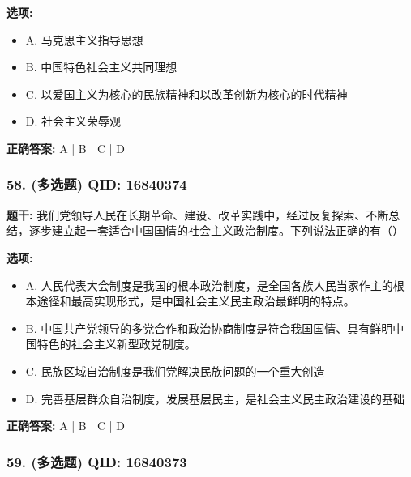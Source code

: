 \documentclass[12pt,UTF8]{ctexart}
\begin{document}
\textbf{选项:}
\begin{itemize}[leftmargin=*]

  \item A. 马克思主义指导思想

  \item B. 中国特色社会主义共同理想

  \item C. 以爱国主义为核心的民族精神和以改革创新为核心的时代精神

  \item D. 社会主义荣辱观

\end{itemize}

\textbf{正确答案:}
A | B | C | D

\vspace{0.3em}\hrulefill\vspace{0.7em}

\subsubsection*{58. (多选题) \small QID: 16840374}

\textbf{题干:}
我们党领导人民在长期革命、建设、改革实践中，经过反复探索、不断总结，逐步建立起一套适合中国国情的社会主义政治制度。下列说法正确的有（）

\textbf{选项:}
\begin{itemize}[leftmargin=*]

  \item A. 人民代表大会制度是我国的根本政治制度，是全国各族人民当家作主的根本途径和最高实现形式，是中国社会主义民主政治最鲜明的特点。

  \item B. 中国共产党领导的多党合作和政治协商制度是符合我国国情、具有鲜明中国特色的社会主义新型政党制度。

  \item C. 民族区域自治制度是我们党解决民族问题的一个重大创造

  \item D. 完善基层群众自治制度，发展基层民主，是社会主义民主政治建设的基础

\end{itemize}

\textbf{正确答案:}
A | B | C | D

\vspace{0.3em}\hrulefill\vspace{0.7em}

\subsubsection*{59. (多选题) \small QID: 16840373}
\end{document}
